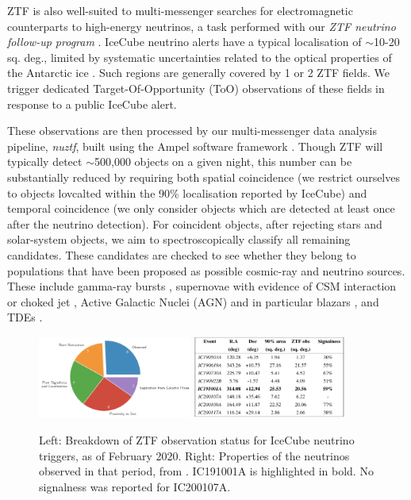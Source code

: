 \documentclass[a4paper,11pt]{article}
\begin{document}
ZTF is also well-suited to multi-messenger searches for electromagnetic counterparts to high-energy neutrinos, a task performed with our \emph{ZTF neutrino follow-up program} \cite{bran}. IceCube neutrino alerts have a typical localisation of $\sim$10-20 sq. deg., limited by systematic uncertainties related to the optical properties of the Antarctic ice \cite{ic_resimulations_21}. Such regions are generally covered by 1 or 2 ZTF fields. We trigger dedicated Target-Of-Opportunity (ToO) observations of these fields in response to a public IceCube alert. 

These observations are then processed by our multi-messenger data analysis pipeline, \emph{nuztf}, built using the Ampel software framework \cite{ampel, nuztf}. Though ZTF will typically detect $\sim$500,000 objects on a given night, this number can be substantially reduced by requiring both spatial coincidence (we restrict ourselves to objects lovcalted within the 90\% localisation reported by IceCube) and temporal coincidence (we only consider objects which are detected at least once after the neutrino detection). For coincident objects, after rejecting stars and solar-system objects, we aim to spectroscopically classify all remaining candidates. These candidates are checked to see whether they belong to populations that have been proposed as possible cosmic-ray and neutrino sources. These include gamma-ray bursts \cite{waxman_bahcall_97_grb}, supernovae with evidence of CSM interaction \cite{murase_csm_sn_11} or choked jet \cite{senno_choked_jets_16}, Active Galactic Nuclei (AGN) \cite{stecker_91} and in particular blazars \cite{mannheim_93}, and TDEs \cite{farrar_09, Biehl_tde_uhecr, hayasaki_19, winter_bran_21, winter_icrc_21, murase_tde_20, liu21_bran}.

\begin{figure}[!ht]
	\centering 
	\includegraphics[width=0.45\textwidth]{figures/ztf_pie}
	\includegraphics[width=0.45\textwidth]{figures/ztf_nu_table}
	\caption{Left: Breakdown of ZTF observation status for IceCube neutrino triggers, as of February 2020. Right: Properties of the neutrinos observed in that period, from \cite{bran}. IC191001A is highlighted in bold. No signalness was reported for IC200107A. }
	\label{fig:ztf_stats_bran}
\end{figure}
\end{document}
